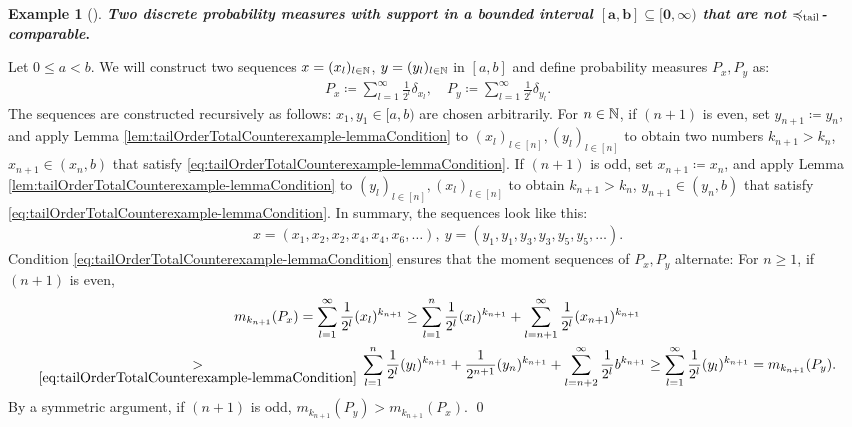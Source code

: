 \documentclass[a4paper]{scrreprt}
\theoremstyle{definition}
\newtheorem{ex}[thm]{Example} %
\begin{document}
    \begin{ex}[{\cite{bib:epperleinTailOrderTotalCounterexample}}]
        \textbf{\textsl{Two discrete probability measures with support in a bounded interval $\mathbf{\boldsymbol{[a, b] \subseteq [0, \infty)}}$ that are not $\preccurlyeq_{\text{tail}}$-comparable}.}
        
        Let $0 \leq a < b$.
        We will construct two sequences $x = (x_l)_{l \in \mathbb{N}}$, $y = (y_l)_{l \in \mathbb{N}}$ in $[a, b]$ and define probability measures $P_x, P_y$ as:
        \begin{gather*}
            P_x \coloneqq \sum_{l=1}^{\infty} \frac{1}{2^l} \delta_{x_l}, \quad
            P_y \coloneqq \sum_{l=1}^{\infty} \frac{1}{2^l} \delta_{y_l}.
        \end{gather*}
        The sequences are constructed recursively as follows: $x_1, y_1 \in [a, b)$ are chosen arbitrarily.
        For $n \in \mathbb{N}$, if $(n+1)$ is even, set $y_{n+1} \coloneqq y_n$, and apply Lemma \ref{lem:tailOrderTotalCounterexample-lemmaCondition} to $(x_l)_{l \in [n]}, (y_l)_{l \in [n]}$ to obtain two numbers $k_{n+1} > k_n$, $x_{n+1} \in (x_n, b)$ that satisfy \eqref{eq:tailOrderTotalCounterexample-lemmaCondition}.
        If $(n+1)$ is odd, set $x_{n+1} \coloneqq x_n$, and apply Lemma \ref{lem:tailOrderTotalCounterexample-lemmaCondition} to $(y_l)_{l \in [n]}, (x_l)_{l \in [n]}$ to obtain $k_{n+1} > k_n$, ${y_{n+1} \in (y_n, b)}$ that satisfy \eqref{eq:tailOrderTotalCounterexample-lemmaCondition}.
        In summary, the sequences look like this:
        \begin{gather*}
            x = (x_1, x_2, x_2, x_4, x_4, x_6, \dots),~ y = (y_1, y_1, y_3, y_3, y_5, y_5, \dots).
        \end{gather*}
        Condition \eqref{eq:tailOrderTotalCounterexample-lemmaCondition} ensures that the moment sequences of $P_x, P_y$ alternate: For $n \geq 1$, if $(n + 1)$ is even,
        \begin{multline*}
            m_{k_{n+1}}(P_x) 
            = \sum_{l=1}^{\infty} \frac{1}{2^l} (x_l)^{k_{n+1}}
            \geq  \sum_{l=1}^{n} \frac{1}{2^l} (x_l)^{k_{n+1}} + \sum_{l = n+1}^{\infty} \frac{1}{2^l} (x_{n+1})^{k_{n+1}} \\
            \underset{\eqref{eq:tailOrderTotalCounterexample-lemmaCondition}}
            {>}\, \sum_{l=1}^{n} \frac{1}{2^l} (y_l)^{k_{n+1}} + \frac{1}{2^{n+1}} (y_n)^{k_{n+1}} + \sum_{l = n+2}^{\infty} \frac{1}{2^l} b^{k_{n+1}}
            \geq \sum_{l=1}^{\infty} \frac{1}{2^l} (y_l)^{k_{n+1}}
            = m_{k_{n+1}}(P_y).
        \end{multline*}
        By a symmetric argument, if $(n+1)$ is odd, $m_{k_{n+1}}(P_y) > m_{k_{n+1}}(P_x)$.
        \qed
    \end{ex}
    
\end{document}
